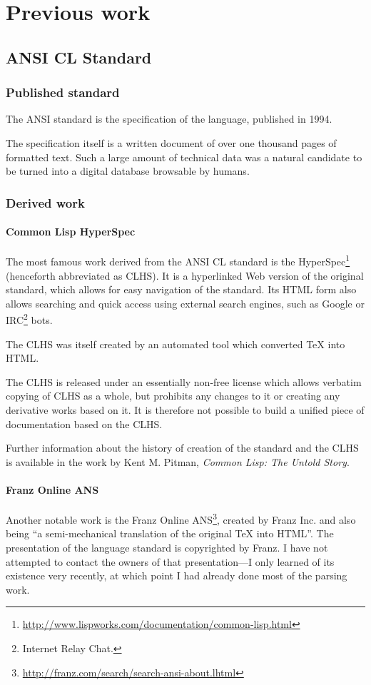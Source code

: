 \section{Previous work}

\subsection{ANSI CL Standard}

\subsubsection{Published standard}

The ANSI \cl{} standard\cite{ANSI:1994:standard} is the specification of the \cl{} language, published in 1994.

The specification itself is a written document of over one thousand pages of formatted text. Such a large amount of technical data was a natural candidate to be turned into a digital database browsable by humans.
\subsubsection{Derived work}
\paragraph{Common Lisp HyperSpec}
The most famous work derived from the ANSI CL standard is the \cl{} HyperSpec\footnote{\url{http://www.lispworks.com/documentation/common-lisp.html}} (henceforth abbreviated as CLHS). It is a hyperlinked Web version of the original standard, which allows for easy navigation of the standard. Its HTML form also allows searching and quick access using external search engines, such as Google or IRC\footnote{Internet Relay Chat.} bots.

The CLHS was itself created by an automated tool which converted TeX into HTML.

The CLHS is released under an essentially non-free license which allows verbatim copying of CLHS as a whole, but prohibits any changes to it or creating any derivative works based on it. It is therefore not possible to build a unified piece of \cl{} documentation based on the CLHS.

Further information about the history of creation of the standard and the CLHS is available in the work by Kent M. Pitman, \textit{Common Lisp: The Untold Story}\cite{kmp:2012:untold}.

\paragraph{Franz Online ANS}
Another notable work is the Franz Online ANS\footnote{\url{
http://franz.com/search/search-ansi-about.lhtml}}, created by Franz Inc. and also being ``a semi-mechanical translation of the original TeX into HTML''. The presentation of the language standard is copyrighted by Franz. I have not attempted to contact the owners of that presentation---I only learned of its existence very recently, at which point I had already done most of the parsing work.

